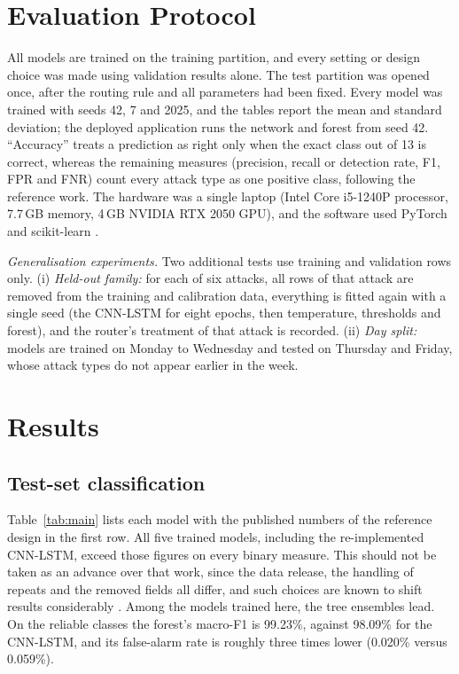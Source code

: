 \documentclass[conference]{IEEEtran}
\begin{document}
\section{Evaluation Protocol}
All models are trained on the training partition, and every setting or design choice was made
using validation results alone. The test partition was opened once, after the routing rule and all
parameters had been fixed. Every model was trained with seeds 42, 7 and 2025, and the tables report
the mean and standard deviation; the deployed application runs the network and forest from seed 42. ``Accuracy''
treats a prediction as right only when the exact class out of 13 is correct, whereas the remaining
measures (precision, recall or detection rate, F1, FPR and FNR) count every attack type as one
positive class, following the reference work. The hardware was a single laptop (Intel Core
i5-1240P processor, 7.7\,GB memory, 4\,GB NVIDIA RTX 2050 GPU), and the software used PyTorch \cite{paszke2019pytorch} and
scikit-learn \cite{pedregosa2011scikit}.

\textit{Generalisation experiments.} Two additional tests use training and validation rows only.
(i) \emph{Held-out family:} for each of six attacks, all rows of that attack are removed from the
training and calibration data, everything is fitted again with a single seed (the CNN-LSTM for eight
epochs, then temperature, thresholds and forest), and the router's treatment of that attack is recorded.
(ii) \emph{Day split:} models are trained on Monday to Wednesday and tested on Thursday and Friday,
whose attack types do not appear earlier in the week.

\section{Results}

\subsection{Test-set classification}
Table~\ref{tab:main} lists each model with the published numbers of the reference design in the
first row. All five trained models, including the re-implemented CNN-LSTM, exceed those figures on every
binary measure. This should not be taken as an advance over that work, since the data release, the
handling of repeats and the removed fields all differ, and such choices are known to shift results
considerably \cite{engelen2021troubleshooting,arp2022dos}. Among the models trained here, the tree
ensembles lead. On the reliable classes the forest's macro-F1 is 99.23\%, against 98.09\% for the
CNN-LSTM, and its false-alarm rate is roughly three times lower (0.020\% versus 0.059\%).
\end{document}
